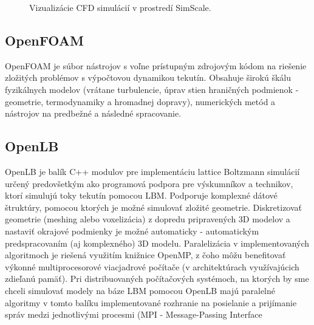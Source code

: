\documentclass[]{tukediphc}
\begin{document}
\begin{figure}[!ht]
	\centering
	\qquad
	\caption{Vizualizácie CFD simulácií v prostredí SimScale.}
\end{figure}

\subsection{OpenFOAM}


OpenFOAM je súbor nástrojov s voľne prístupným zdrojovým kódom na riešenie zložitých problémov s výpočtovou dynamikou tekutín. Obsahuje širokú škálu fyzikálnych modelov (vrátane turbulencie, úprav stien hraničných podmienok - geometrie, termodynamiky a hromadnej dopravy), numerických metód a nástrojov na predbežné a následné spracovanie.

\subsection{OpenLB}

OpenLB je balík C++ modulov pre implementáciu lattice Boltzmann simulácií určený predovšetkým ako programová podpora pre výskumníkov a technikov, ktorí simulujú toky tekutín pomocou LBM. Podporuje komplexné dátové štruktúry, pomocou ktorých je možné simulovať zložité geometrie. Diskretizovať geometrie (meshing alebo voxelizácia) z dopredu pripravených 3D modelov a nastaviť okrajové podmienky je možné automaticky - automatickým predspracovaním (aj komplexného) 3D modelu. Paralelizácia v implementovaných algoritmoch je riešená využitím knižnice OpenMP, z čoho môžu benefitovať výkonné multiprocesorové viacjadrové počítače (v architektúrach využívajúcich zdieľanú pamäť). Pri distribuovaných počítačových systémoch, na ktorých by sme chceli simulovať modely na báze LBM pomocou OpenLB majú paralelné algoritmy v tomto balíku implementované rozhranie na posielanie a prijímanie správ medzi jednotlivými procesmi (MPI - Message-Passing Interface
\end{document}

